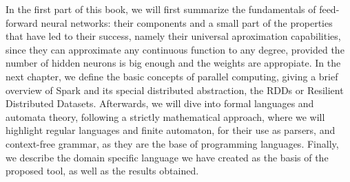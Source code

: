 \vspace{10pt}
In the first part of this book, we will first summarize the fundamentals of feed-forward neural networks: their 
components and a small part of the properties that have led to their success, namely their universal aproximation 
capabilities, since they can approximate any continuous function to any degree, provided the number of hidden neurons 
is big enough and the weights are appropiate. In the next chapter, we define the basic concepts of parallel computing, 
giving a brief overview of Spark and its special distributed abstraction, the RDDs or Resilient Distributed Datasets. 
Afterwards, we will dive into formal languages and automata theory, following a strictly mathematical approach, where we 
will highlight regular languages and finite automaton, for their use as parsers, and context-free grammar, as they are the 
base of programming languages. Finally, we describe the domain specific language we have created as the basis of the 
proposed tool, as well as the results obtained.

\endinput
